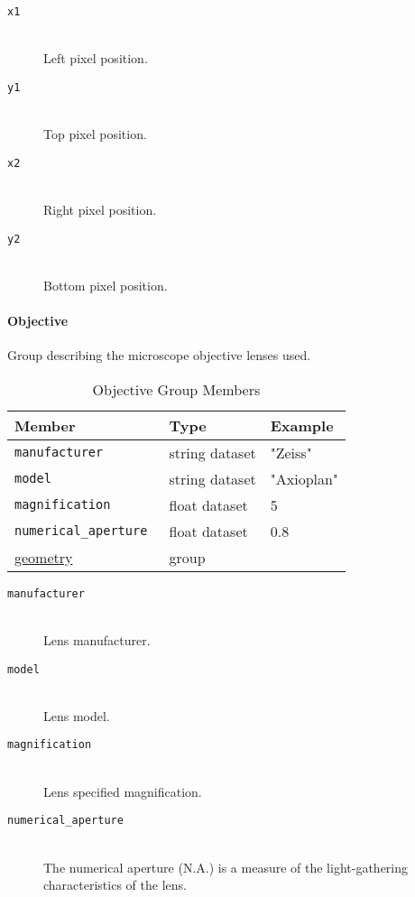 \begin{description}
\item[\tt{x1}] \hfill \\
{Left pixel position.}

\item[\tt{y1}] \hfill \\
{Top pixel position.}

\item[\tt{x2}] \hfill \\
{Right pixel position.}

\item[\tt{y2}] \hfill \\
{Bottom pixel position.}
\end{description}

\paragraph{Objective}
\label{table:objective}

Group describing the microscope objective lenses used.

\begin{table}[h!]\sffamily \footnotesize
\caption{Objective Group Members}
\centering
{}
\begin{tabular}{l l l}
\toprule
\bfseries Member     & \bfseries Type & \bfseries Example \\
\midrule
\tt{manufacturer} & string dataset & "Zeiss"  \\
\tt{model} & string dataset & "Axioplan" \\
\tt{magnification} & float dataset & 5 \\ 
\tt{numerical\_aperture} & float dataset & 0.8 \\
\hyperref[tomo:geometry]{geometry} &  group & \\
\bottomrule
\end{tabular}
\end{table}

\begin{description}
\item[\tt{manufacturer}] \hfill \\
{Lens manufacturer.}

\item[\tt{model}] \hfill \\
{Lens model.}

\item[\tt{magnification}] \hfill \\
{Lens specified magnification.}

\item[\tt{numerical\_aperture}] \hfill \\
{The numerical aperture (N.A.) is a measure of the light-gathering characteristics of the lens.}
\end{description}

